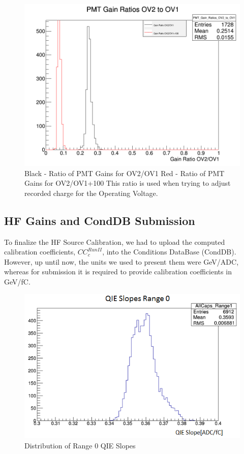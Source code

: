 \begin{figure}[htb]
	\begin{center}
		\includegraphics[width=.5\textwidth]{figures/ch_hfcalibration/GainRatios.png}
		\caption
		{ Black - Ratio of PMT Gains for OV2/OV1
		  Red - Ratio of PMT Gains for OV2/OV1+100
		 This ratio is used when trying to adjust recorded charge for the Operating Voltage.
		}
		\label{fig:PMT_Gains}
	\end{center}
\end{figure}

\subsection{HF Gains and CondDB Submission}
To finalize the HF Source Calibration, we had to upload the computed calibration
coefficients, ${CC}^{Run II}_{c}$, into the Conditions DataBase (CondDB).
However, up until now, the units we used to present them were GeV/ADC, whereas
for submission it is required to provide calibration coefficients in GeV/fC.

\begin{figure}[htb]
	\begin{center}
		\includegraphics[width=.5\textwidth]{figures/ch_hfcalibration/QIE_Slopes_Range0.png}
		\caption{Distribution of Range 0 QIE Slopes}
		\label{fig:QIESlopes}
	\end{center}
\end{figure}

